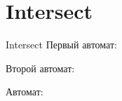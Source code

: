 \section{Intersect}
\begin{frame}{Intersect}
	Первый автомат:


	Второй автомат:


	Автомат:


\end{frame}
